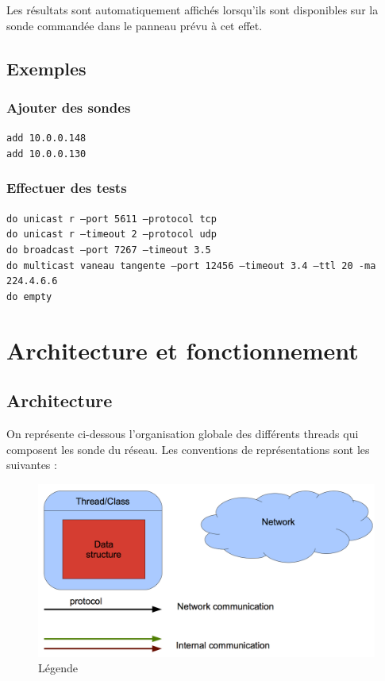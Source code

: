 \documentclass[a4paper,11pt]{article}
\begin{document}
Les résultats sont automatiquement affichés lorsqu'ils sont disponibles sur la sonde commandée dans le panneau prévu à cet effet.


\subsection{Exemples}
\subsubsection{Ajouter des sondes}
\texttt{add 10.0.0.148}\\
\indent\texttt{add 10.0.0.130}

\subsubsection{Effectuer des tests}
\texttt{do unicast r --port 5611 --protocol tcp}\\
\indent\texttt{do unicast r --timeout 2 --protocol udp}\\
\indent\texttt{do broadcast --port 7267 --timeout 3.5 }\\
\indent\texttt{do multicast vaneau tangente --port 12456 --timeout 3.4 --ttl 20 -ma 224.4.6.6}\\
\indent\texttt{do empty}

\section{Architecture et fonctionnement}


\subsection{Architecture}

On représente ci-dessous l'organisation globale des différents threads qui composent les sonde du réseau.
Les conventions de représentations sont les suivantes :
\begin{figure}[!ht]
\centering\includegraphics[width=\linewidth]{img/graphLegend.png}
\caption{Légende}
\end{figure}
\end{document}
